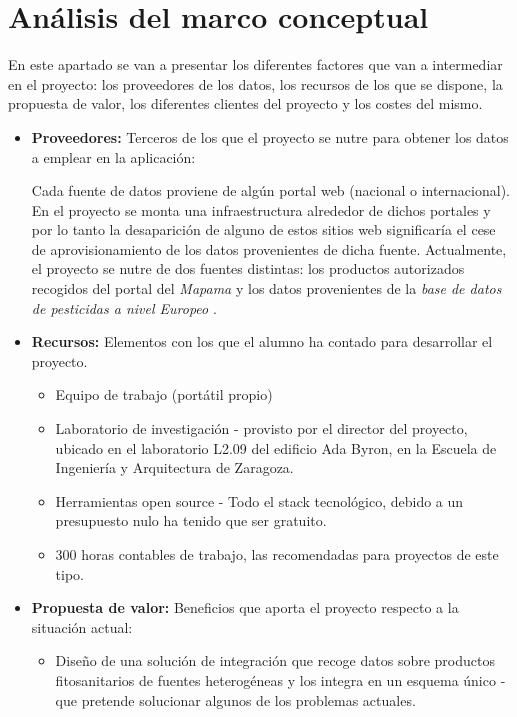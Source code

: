 \section{Análisis del marco conceptual} \label{analisis.marco}
En este apartado se van a presentar los diferentes factores que van a intermediar en el proyecto: los proveedores de los datos, los recursos de los que se dispone, la propuesta de valor, los diferentes clientes del proyecto y los costes del mismo. \par
\begin{itemize}
\item \textbf{Proveedores:} Terceros de los que el proyecto se nutre para obtener los datos a emplear en la aplicación: \par Cada fuente de datos proviene de algún portal web (nacional o internacional). En el proyecto se monta una infraestructura alrededor de dichos portales y por lo tanto la desaparición de alguno de estos sitios web significaría el cese de aprovisionamiento de los datos provenientes de dicha fuente. Actualmente, el proyecto se nutre de dos fuentes distintas: los productos autorizados recogidos del portal del \textit{Mapama} \cite{mapama} y los datos provenientes de la \textit{base de datos de pesticidas a nivel Europeo} \cite{pesticidesdb}.
\item \textbf{Recursos:} Elementos con los que el alumno ha contado para desarrollar el proyecto. 
\begin{itemize}
\item Equipo de trabajo (portátil propio)
\item Laboratorio de investigación - provisto por el director del proyecto, ubicado en el laboratorio L2.09 del edificio Ada Byron, en la Escuela de Ingeniería y Arquitectura de Zaragoza.
\item Herramientas open source - Todo el stack tecnológico, debido a un presupuesto nulo ha tenido que ser gratuito.
\item 300 horas contables de trabajo, las recomendadas para proyectos de este tipo.
\end{itemize}
\item \textbf{Propuesta de valor:} Beneficios que aporta el proyecto respecto a la situación actual:
\begin{itemize}
\item Diseño de una solución de integración que recoge datos sobre productos fitosanitarios de fuentes heterogéneas y los integra en un esquema único - que pretende solucionar algunos de los problemas actuales.

\end{itemize}
\end{itemize}
